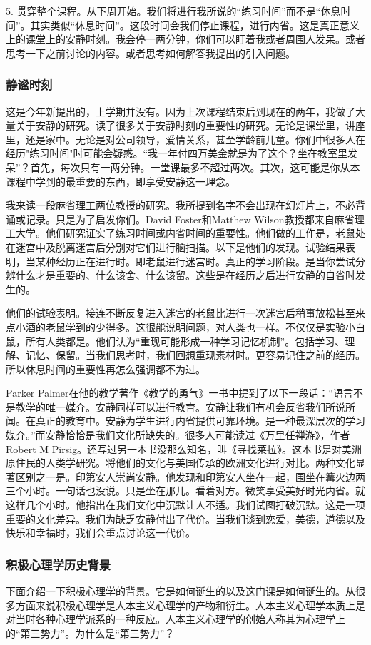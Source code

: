 5. 贯穿整个课程。从下周开始。我们将进行我所说的“练习时间”而不是“休息时间”。其实类似“休息时间”。这段时间会我们停止课程，进行内省。这是真正意义上的课堂上的安静时刻。我会停一两分钟，你们可以盯着我或者周围人发呆。或者思考一下之前讨论的内容。或者思考如何解答我提出的引入问题。

\subsubsection{静谧时刻}
这是今年新提出的，上学期并没有。因为上次课程结束后到现在的两年，我做了大量关于安静的研究。读了很多关于安静时刻的重要性的研究。无论是课堂里，讲座里，还是家中。无论是对公司领导，爱情关系，甚至学龄前儿童。你们中很多人在经历"练习时间"时可能会疑惑。“我一年付四万美金就是为了这个？坐在教室里发呆”？首先，每次只有一两分钟。一堂课最多不超过两次。其次，这可能是你从本课程中学到的最重要的东西，即享受安静这一理念。

我来读一段麻省理工两位教授的研究。我所提到名字不会出现在幻灯片上，不必背诵或记录。只是为了启发你们。David Foster和Matthew Wilson教授都来自麻省理工大学。他们研究证实了练习时间或内省时间的重要性。他们做的工作是，老鼠处在迷宫中及脱离迷宫后分别对它们进行脑扫描。以下是他们的发现。试验结果表明，当某种经历正在进行时。即老鼠进行迷宫时。真正的学习阶段。是当你尝试分辨什么才是重要的、什么该舍、什么该留。这些是在经历之后进行安静的自省时发生的。

他们的试验表明。接连不断反复进入迷宫的老鼠比进行一次迷宫后稍事放松甚至来点小酒的老鼠学到的少得多。这很能说明问题，对人类也一样。不仅仅是实验小白鼠，所有人类都是。他们认为“重现可能形成一种学习记忆机制”。包括学习、理解、记忆、保留。当我们思考时，我们回想重现素材时。更容易记住之前的经历。所以休息时间的重要性再怎么强调都不为过。

Parker Palmer在他的教学著作《教学的勇气》一书中提到了以下一段话：“语言不是教学的唯一媒介。安静同样可以进行教育。安静让我们有机会反省我们所说所闻。在真正的教育中。安静为学生进行内省提供可靠环境。是一种最深层次的学习媒介。”而安静恰恰是我们文化所缺失的。很多人可能读过《万里任禅游》，作者Robert M Pirsig。还写过另一本书没那么知名，叫《寻找莱拉》。这本书是对美洲原住民的人类学研究。将他们的文化与美国传承的欧洲文化进行对比。两种文化显著区别之一是。印第安人崇尚安静。他发现和印第安人坐在一起，围坐在篝火边两三个小时。一句话也没说。只是坐在那儿。看着对方。微笑享受美好时光内省。就这样几个小时。他指出在我们文化中沉默让人不适。我们试图打破沉默。这是一项重要的文化差异。我们为缺乏安静付出了代价。当我们谈到恋爱，美德，道德以及快乐和幸福时，我们会重点讨论这一代价。

\subsubsection{积极心理学历史背景}
下面介绍一下积极心理学的背景。它是如何诞生的以及这门课是如何诞生的。从很多方面来说积极心理学是人本主义心理学的产物和衍生。人本主义心理学本质上是对当时各种心理学派系的一种反应。人本主义心理学的创始人称其为心理学上的“第三势力”。为什么是“第三势力”？


